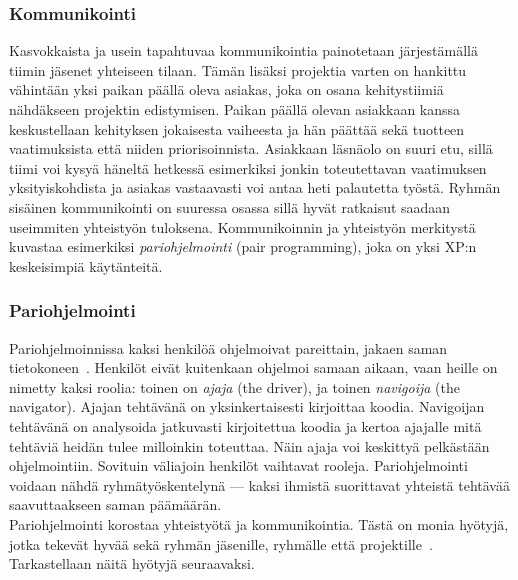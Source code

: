 \documentclass[finnish]{../tktltiki2}
\theoremstyle{definition}
\theoremstyle{remark}
\begin{document}
\subsubsection{Kommunikointi}

Kasvokkaista ja usein tapahtuvaa kommunikointia painotetaan järjestämällä tiimin jäsenet yhteiseen tilaan. Tämän lisäksi projektia varten on hankittu vähintään yksi paikan päällä oleva asiakas, joka on osana kehitystiimiä nähdäkseen projektin edistymisen. Paikan päällä olevan asiakkaan kanssa keskustellaan kehityksen jokaisesta vaiheesta ja hän päättää sekä tuotteen vaatimuksista että niiden priorisoinnista. Asiakkaan läsnäolo on suuri etu, sillä tiimi voi kysyä häneltä hetkessä esimerkiksi jonkin toteutettavan vaatimuksen yksityiskohdista ja asiakas vastaavasti voi antaa heti palautetta työstä. Ryhmän sisäinen kommunikointi on suuressa osassa sillä hyvät ratkaisut saadaan useimmiten yhteistyön tuloksena. Kommunikoinnin ja yhteistyön merkitystä kuvastaa esimerkiksi \emph{pariohjelmointi} (pair 
programming), joka on yksi XP:n keskeisimpiä käytänteitä.

\subsubsection{Pariohjelmointi}

Pariohjelmoinnissa kaksi henkilöä ohjelmoivat pareittain, jakaen saman 
tietokoneen~\cite{Shore:2007:AAD:1407480}. Henkilöt eivät kuitenkaan ohjelmoi samaan aikaan, vaan 
heille on 
nimetty kaksi roolia: toinen on \emph{ajaja} (the driver), ja toinen 
\emph{navigoija} (the navigator). Ajajan tehtävänä on 
yksinkertaisesti 
kirjoittaa koodia. Navigoijan tehtävänä on analysoida jatkuvasti 
kirjoitettua koodia ja kertoa ajajalle mitä tehtäviä heidän tulee 
milloinkin 
toteuttaa. Näin ajaja voi keskittyä pelkästään ohjelmointiin. Sovituin 
väliajoin henkilöt vaihtavat rooleja. Pariohjelmointi voidaan nähdä 
ryhmätyöskentelynä --- kaksi ihmistä suorittavat yhteistä tehtävää 
saavuttaakseen saman päämäärän.\\

Pariohjelmointi korostaa yhteistyötä ja kommunikointia. Tästä on monia 
hyötyjä, jotka tekevät hyvää sekä ryhmän jäsenille, ryhmälle että 
projektille~\cite{Begel:2008:PPW:1414004.1414026}. Tarkastellaan näitä 
hyötyjä seuraavaksi. 
\end{document}
